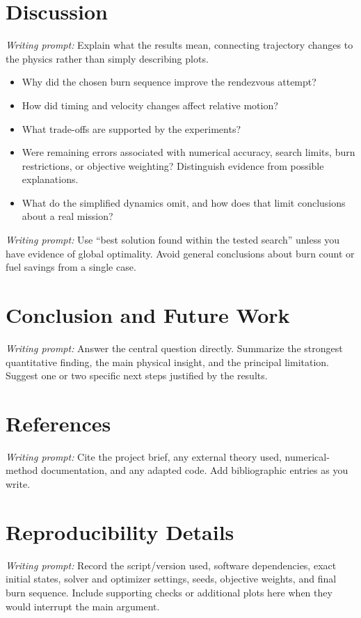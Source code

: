 \documentclass[11pt,letterpaper]{article}
\newcommand{\prompt}[1]{\par\noindent\textit{Writing prompt:} #1\par}
\begin{document}
\section{Discussion}
\prompt{Explain what the results mean, connecting trajectory changes to
the physics rather than simply describing plots.}
\begin{itemize}
  \item Why did the chosen burn sequence improve the rendezvous attempt?
  \item How did timing and velocity changes affect relative motion?
  \item What trade-offs are supported by the experiments?
  \item Were remaining errors associated with numerical accuracy, search
        limits, burn restrictions, or objective weighting? Distinguish
        evidence from possible explanations.
  \item What do the simplified dynamics omit, and how does that limit
        conclusions about a real mission?
\end{itemize}
\prompt{Use ``best solution found within the tested search'' unless you
have evidence of global optimality. Avoid general conclusions about burn
count or fuel savings from a single case.}

\section{Conclusion and Future Work}
\prompt{Answer the central question directly. Summarize the strongest
quantitative finding, the main physical insight, and the principal
limitation. Suggest one or two specific next steps justified by the results.}

\section*{References}
\prompt{Cite the project brief, any external theory used, numerical-method
documentation, and any adapted code. Add bibliographic entries as you write.}

\appendix
\section{Reproducibility Details}
\prompt{Record the script/version used, software dependencies, exact initial
states, solver and optimizer settings, seeds, objective weights, and final
burn sequence. Include supporting checks or additional plots here when
they would interrupt the main argument.}
\end{document}
